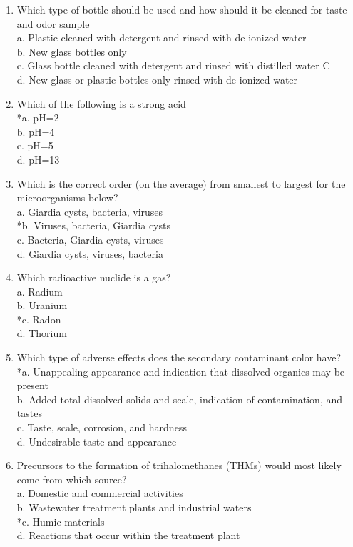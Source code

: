 \begin{enumerate}[1.]
\item Which type of bottle should be used and how should it be cleaned for taste and odor sample\\
a.  Plastic cleaned with detergent and rinsed with de-ionized water\\
b.  New glass bottles only\\
c.  Glass bottle cleaned with detergent and rinsed with distilled water C\\
d.  New glass or plastic bottles only rinsed with de-ionized water\\

\item Which of the following is a strong acid\\
*a.  pH=2\\
b.  pH=4\\
c.  pH=5\\
d.  pH=13\\

\item Which is the correct order (on the average) from smallest to largest for the microorganisms below?\\
a.	Giardia cysts, bacteria, viruses\\
*b.	Viruses, bacteria, Giardia cysts\\
c.	Bacteria, Giardia cysts, viruses\\
d.	Giardia cysts, viruses, bacteria\\


 \item Which radioactive nuclide is a gas?\\
a. Radium\\
b. Uranium\\
*c. Radon\\
d. Thorium 

  \item Which type of adverse effects does the secondary contaminant color have?\\
*a. Unappealing appearance and indication that dissolved organics may be present\\
b. Added total dissolved solids and scale, indication of contamination, and tastes\\
c. Taste, scale, corrosion, and hardness\\
d. Undesirable taste and appearance\\

  \item Precursors to the formation of trihalomethanes (THMs) would most likely come from which source?\\
a. Domestic and commercial activities\\
b. Wastewater treatment plants and industrial waters\\
*c. Humic materials\\
d. Reactions that occur within the treatment plant 


\end{enumerate}
